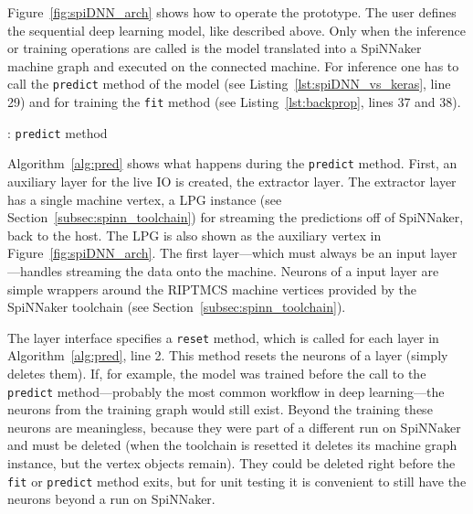 \documentclass[]{article}
\begin{document}
Figure~\ref{fig:spiDNN_arch} shows how to operate the prototype.
The user defines the sequential deep learning model, like described
above.
Only when the inference or training operations are called is the
model translated into a SpiNNaker machine graph and executed on the
connected machine.
For inference one has to call the \texttt{predict} method of the model
(see Listing~\ref{lst:spiDNN_vs_keras}, line 29)
and for training the \texttt{fit} method
(see Listing~\ref{lst:backprop}, lines 37 and 38).

\begin{algorithm} %
  \caption{: \texttt{predict} method}
  \label{alg:pred}

  \begin{algorithmic}[1]
  \end{algorithmic}
\end{algorithm} %

Algorithm~\ref{alg:pred} shows what happens during the
\texttt{predict} method.
First, an auxiliary layer for the live IO is created, the extractor
layer.
The extractor layer has a single machine vertex, a LPG instance
(see Section~\ref{subsec:spinn_toolchain}) for streaming the
predictions off of SpiNNaker, back to the host.
The LPG is also shown as the auxiliary vertex in
Figure~\ref{fig:spiDNN_arch}.
The first layer---which must always be an input layer---handles
streaming the data onto the machine.
Neurons of a input layer are simple wrappers around the RIPTMCS
machine vertices provided by the SpiNNaker toolchain (see
Section~\ref{subsec:spinn_toolchain}).

The layer interface specifies a \texttt{reset} method, which is
called for each layer in Algorithm~\ref{alg:pred}, line 2.
This method resets the neurons of a layer (simply deletes them).
If, for example, the model was trained before the call to the
\texttt{predict} method---probably the most common workflow in deep
learning---the neurons from the training graph would still exist.
Beyond the training these neurons are meaningless, because they were
part of a different run on SpiNNaker and must be deleted (when the
toolchain is resetted it deletes its machine graph instance, but the
vertex objects remain).
They could be deleted right before the \texttt{fit} or
\texttt{predict} method exits, but for unit testing it is convenient
to still have the neurons beyond a run on SpiNNaker.
\end{document}
